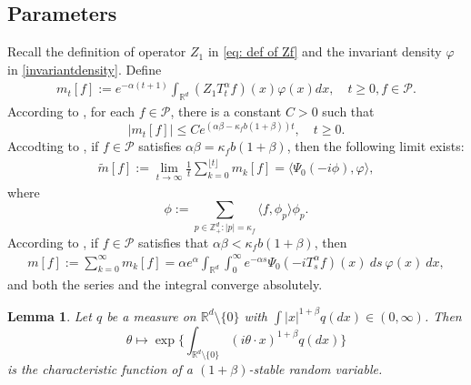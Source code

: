 \documentclass[12pt]{amsart}
\theoremstyle{plain}
\newtheorem{lem}[thm]{Lemma}
\theoremstyle{definition}
\numberwithin{equation}{section}
\begin{document}
\subsection{Parameters}
    Recall the definition of operator $Z_1$ in \eqref{eq: def of Zf} and the invariant density $\varphi$ in \eqref{invariantdensity}.
    Define
 \begin{align}
 \label{parameter_mk}
      m_t[f]
      :=e^{-\alpha (t+1)}\int_{\mathbb R^d} (Z_1T_t^{\alpha}f)(x)\varphi(x)dx,\quad t\geq 0, f\in \mathcal P.
 \end{align}
    According to \cite[Lemma 2.7]{MM}, for each $f\in\mathcal{P}$, there is a constant $C>0$ such that
\[
    |m_t[f]|
    \leq C e^{(\alpha\beta-\kappa_fb(1+\beta))t},
    \quad t\geq 0.
\]
    Accodting to \cite[Lemma 4.2]{MM}, if $f \in \mathcal{P}$ satisfies $\alpha\beta=\kappa_f b(1+\beta)$, then the following limit exists:
\begin{align}
\label{para: critical case}
    \tilde{m}[f]:=\lim_{t\rightarrow \infty}\frac{1}{t}\sum_{k=0}^{\lfloor t \rfloor}m_k[f]=\langle\Psi_0(-i\phi),\varphi\rangle,
\end{align}
    where
\[
    \phi
    :=\sum_{p\in \mathbb Z_+^d:|p|=\kappa_f}\langle f, \phi_p\rangle\phi_p.
\]
    According to \cite[Lemma 5.1]{MM}, if $f\in \mathcal{P}$ satisfies that $\alpha\beta<\kappa_fb(1+\beta)$, then 
\begin{align}
    m[f]
    :=\sum_{k=0}^\infty m_k[f]
    =\alpha e^{\alpha}\int_{\mathbb{R}^d}\int_0^{\infty} e^{-\alpha s}\Psi_0(-iT_{s}^{\alpha}f)(x)~ds~\varphi(x)~dx, \label{msmallcase}
\end{align}
and both the series and the integral converge absolutely.
\begin{lem}
\label{lem: charactreisticfunction}
    Let $q$ be a measure on $\mathbb R^d\setminus\{0\}$ with $\int |x|^{1+\beta} q(dx) \in (0,\infty)$.
    Then $$\theta \mapsto  \exp\Big\{\int_{\mathbb R^d\setminus\{0\}} (i\theta \cdot x)^{1+\beta} q(dx)\Big\}$$
    is the characteristic function of a $(1+\beta)$-stable random variable.
\end{lem}
\end{document}
